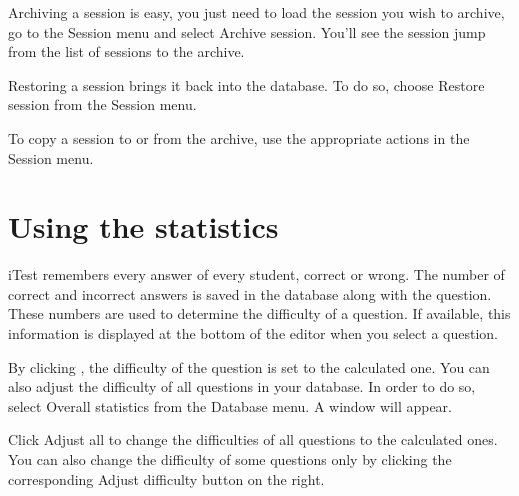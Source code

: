 Archiving a session is easy, you just need to load the session you wish to archive, go to the Session menu and select Archive session.
You'll see the session jump from the list of sessions to the archive.


Restoring a session brings it back into the database.
To do so, choose Restore session from the Session menu.

To copy a session to or from the archive, use the appropriate actions in the Session menu.

\section{Using the statistics}

iTest remembers every answer of every student, correct or wrong.
The number of correct and incorrect answers is saved in the database along with the question.
These numbers are used to determine the difficulty of a question.
If available, this information is displayed at the bottom of the editor when you select a question.


By clicking , the difficulty of the question is set to the calculated one.
You can also adjust the difficulty of all questions in your database.
In order to do so, select Overall statistics from the Database menu.
A window will appear.


Click Adjust all to change the difficulties of all questions to the calculated ones.
You can also change the difficulty of some questions only by clicking the corresponding Adjust difficulty button on the right.
